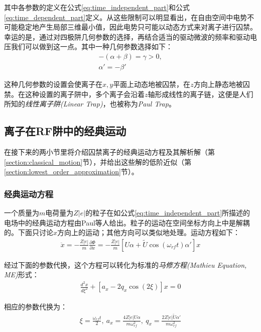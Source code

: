 其中各参数的定义在公式\eqref{eq:time_independent_part}和公式\eqref{eq:time_dependent_part}定义。从这些限制可以明显看出，在自由空间中电势不可能稳定地产生局部三维最小值，因此电势只可能以动态方式来对离子进行囚禁。幸运的是，通过对四极阱几何参数的选择，再结合适当的驱动微波的频率和驱动电压我们可以做到这一点。其中一种几何参数选择如下：
\begin{align}
    -(\alpha + \beta )= \gamma > 0,\\
    \alpha ' = - \beta '
\end{align}

这种几何参数的设置会使离子在$x,y$平面上动态地被囚禁，在$z$方向上静态地被囚禁。在这种设置的离子阱中，多个离子会沿着$z$轴形成线性的离子链，这便是人们所知的\emph{线性离子阱(Linear Trap)}，也被称为\emph{Paul Trap}\cite[]{Paul_1990}。


\subsection[离子在RF阱中的经典运动]{离子在RF阱中的经典运动\label{section:ion_classical_motion}}

在接下来的两小节里将介绍囚禁离子的经典运动方程及其解析解（第\ref{section:classical_motion}节），并给出这些解的低阶近似（第\ref{section:lowest_order_approximation}节）。

\subsubsection[经典运动方程]{经典运动方程\label{section:classical_motion}}

一个质量为$m$电荷量为$Z|e|$的粒子在如公式\eqref{eq:time_independent_part}所描述的电场中的经典运动方程由Paul等人\cite[p415]{Paul1958}给出。粒子的运动在空间坐标方向上中是解耦的。下面只讨论$x$方向上的运动；其他方向可以类似地处理。运动方程如下：
\begin{align}
    \ddot{x}=-\frac{Z|e|}{m}\frac{\partial \Phi}{\partial x}=-\frac{Z|e|}{m}[U\alpha + \tilde{U}\cos(\omega_{rf}t)\alpha ']x
\end{align}

经过下面的参数代换，这个方程可以转化为标准的\emph{马修方程(Mathieu Equation, ME)}形式：
\begin{align}
    \frac{d^2x}{d\xi^2}+[a_x-2q_x\cos(2\xi)]x=0\label{eq:mathieu_equation}
\end{align}

相应的参数代换为：
\begin{align}
    \xi=\frac{\omega_{rf}t}{2},\ a_x=\frac{4Z|e|U\alpha}{m\omega_{rf}^2},\ q_x=\frac{2Z|e|\tilde{U}\alpha '}{m\omega_{rf}^2}\label{eq:parameters_substitution}
\end{align}

